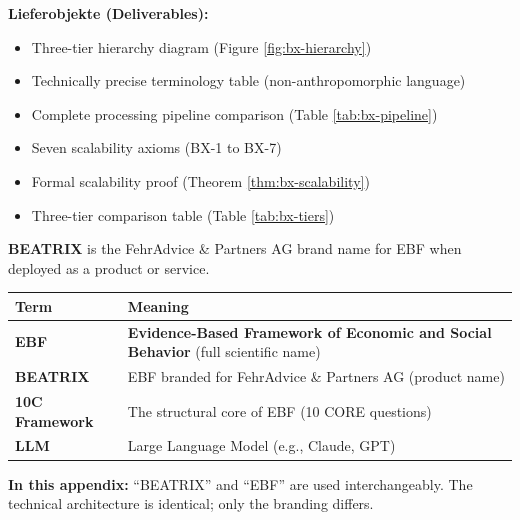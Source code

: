 \begin{tcolorbox}[
    colback=orange!5!white,
    colframe=orange!75!black,
    title={\textbf{Appendix Scope: Ziel / In-Scope / Out-of-Scope / Constraints}},
    fonttitle=\bfseries
]
\textbf{Lieferobjekte (Deliverables):}
\begin{itemize}[nosep]
    \item Three-tier hierarchy diagram (Figure \ref{fig:bx-hierarchy})
    \item Technically precise terminology table (non-anthropomorphic language)
    \item Complete processing pipeline comparison (Table \ref{tab:bx-pipeline})
    \item Seven scalability axioms (BX-1 to BX-7)
    \item Formal scalability proof (Theorem \ref{thm:bx-scalability})
    \item Three-tier comparison table (Table \ref{tab:bx-tiers})
\end{itemize}

\end{tcolorbox}



\begin{tcolorbox}[colback=blue!10!white, colframe=blue!75!black,
    title=\textbf{Naming Convention: BEATRIX = EBF}]

\textbf{BEATRIX} is the FehrAdvice \& Partners AG brand name for EBF when deployed as a product or service.

\begin{table}[H]
\centering
\renewcommand{\arraystretch}{1.3}
\begin{tabular}{@{}lp{9cm}@{}}
\toprule
\textbf{Term} & \textbf{Meaning} \\
\midrule
\textbf{EBF} & \textbf{Evidence-Based Framework of Economic and Social Behavior} (full scientific name) \\
\textbf{BEATRIX} & EBF branded for FehrAdvice \& Partners AG (product name) \\
\textbf{10C Framework} & The structural core of EBF (10 CORE questions) \\
\textbf{LLM} & Large Language Model (e.g., Claude, GPT) \\
\bottomrule
\end{tabular}
\end{table}

\textbf{In this appendix:} ``BEATRIX'' and ``EBF'' are used interchangeably. The technical architecture is identical; only the branding differs.

\end{tcolorbox}


